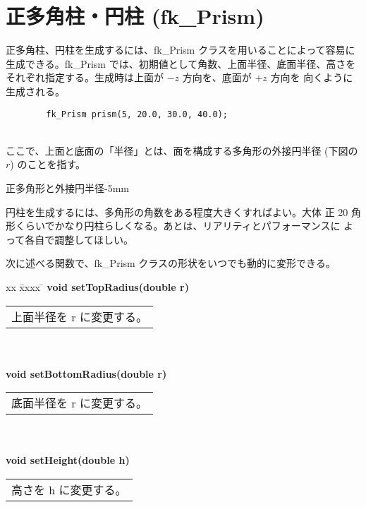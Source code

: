 \section{正多角柱・円柱 (fk\_Prism)}
正多角柱、円柱を生成するには、fk\_Prism クラスを用いることによって容易に
生成できる。fk\_Prism では、初期値として角数、上面半径、底面半径、高さを
それぞれ指定する。生成時は上面が \(-z\) 方向を、底面が \(+z\) 方向を
向くように生成される。
\\
\begin{screen}
\begin{verbatim}
        fk_Prism prism(5, 20.0, 30.0, 40.0);
\end{verbatim}
\end{screen}
~ \\
ここで、上面と底面の「半径」とは、面を構成する多角形の外接円半径
(下図の \(r\)) のことを指す。

	{正多角形と外接円半径}{-5mm}

円柱を生成するには、多角形の角数をある程度大きくすればよい。大体
正 20 角形くらいでかなり円柱らしくなる。あとは、リアリティとパフォーマンスに
よって各自で調整してほしい。

次に述べる関数で、fk\_Prism クラスの形状をいつでも動的に変形できる。
\begin{tabbing}
xx \= xxxx \= \kill
\> \textbf{void setTopRadius(double r)} \\
	\> \> \begin{tabular}{p{15cm}}
		上面半径を r に変更する。
	\end{tabular} \\ \\

\> \textbf{void setBottomRadius(double r)} \\
	\> \> \begin{tabular}{p{15cm}}
		底面半径を r に変更する。
	\end{tabular} \\ \\

\> \textbf{void setHeight(double h)} \\
	\> \> \begin{tabular}{p{15cm}}
		高さを h に変更する。
	\end{tabular}
\end{tabbing}

